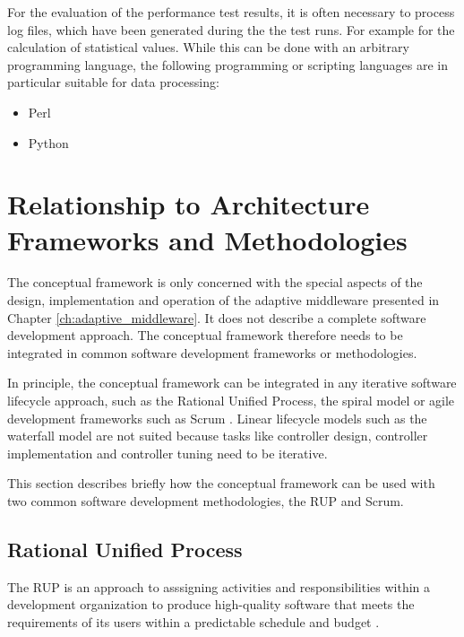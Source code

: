 For the evaluation of the performance test results, it is often necessary to process log files, which have been generated during the the test runs. For example for the calculation of statistical values. While this can be done with an arbitrary programming language, the following programming or scripting languages are in particular suitable for data processing:

\begin{itemize}
	\item Perl 
	\item Python
\end{itemize}


\section{Relationship to Architecture Frameworks and Methodologies} 
\label{sec:ch6_other_frameworks}

The conceptual framework is only concerned with the special aspects of the design, implementation and operation of the adaptive middleware presented in Chapter \ref{ch:adaptive_middleware}. It does not describe a complete software development approach. The conceptual framework therefore needs to be integrated in common software development frameworks or methodologies.

In principle, the conceptual framework can be integrated in any iterative software lifecycle approach, such as the Rational Unified Process, the spiral model \citep{Boehm:1988cd} or agile development frameworks such as Scrum \citep{Schwaber:2013aa}. Linear lifecycle models such as the waterfall model \citep{Royce:1987tl} are not suited because tasks like controller design, controller implementation and controller tuning need to be iterative.

This section describes briefly how the conceptual framework can be used with two common software development methodologies, the \ac{RUP} and Scrum.

\subsection{Rational Unified Process}
The \acf{RUP} is an approach to asssigning activities and responsibilities within a development organization to produce high-quality software that meets the requirements of its users within a predictable schedule and budget \citep{Rational:2001aa}.

